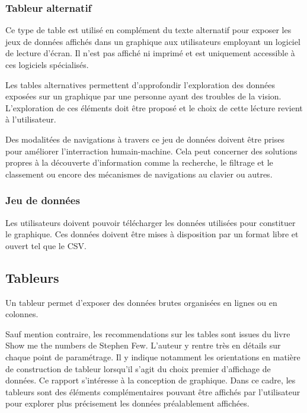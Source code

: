 \documentclass[a4paper,12pt]{article}
\begin{document}
\begin{multicols}{2}
\subsubsection*{Tableur alternatif}
\label{sec:org7094a5d}
Ce type de table est utilisé en complément du texte alternatif pour exposer les jeux de données affichés dans un graphique aux utilisateurs employant un logiciel de lecture d'écran. Il n'est pas affiché ni imprimé et est uniquement accessible à ces logiciels spécialisés.

Les tables alternatives permettent d'approfondir l'exploration des données exposées sur un graphique par une personne ayant des troubles de la vision. L'exploration de ces éléments doit être proposé et le choix de cette lécture revient à l'utilisateur. \autocite{sarahfossheimCreatingBetterScreen2022}

Des modalitées de navigations à travers ce jeu de données doivent être prises pour améliorer l'interraction humain-machine. Cela peut concerner des solutions propres à la découverte d'information comme la recherche, le filtrage et le classement ou encore des mécanismes de navigations au clavier ou autres. \autocite{sarahfossheimCreatingBetterScreen2022}
\subsubsection*{Jeu de données}
\label{sec:org5663c71}
Les utilisateurs doivent pouvoir télécharger les données utilisées pour constituer le graphique. Ces données doivent être mises à disposition par un format libre et ouvert tel que le CSV. \autocite{frankelavskyRightToolsJob2022}
\subsection*{Tableurs}
\label{sec:org8d911a2}
Un tableur permet d'exposer des données brutes organisées en lignes ou en colonnes. \autocite{mikeyiHowChooseRight2020}

Sauf mention contraire, les recommendations sur les tables sont issues du livre \og Show me the numbers\fg{} de Stephen Few.\autocite{stephenfewShowMeNumbers2012} L'auteur y rentre très en détails sur chaque point de paramétrage. Il y indique notamment les orientations en matière de construction de tableur lorsqu'il s'agit du choix premier d'affichage de données. Ce rapport s'intéresse à la conception de graphique. Dans ce cadre, les tableurs sont des éléments complémentaires pouvant être affichés par l'utilisateur pour explorer plus précisement les données préalablement affichées.


\end{multicols}
\end{document}
